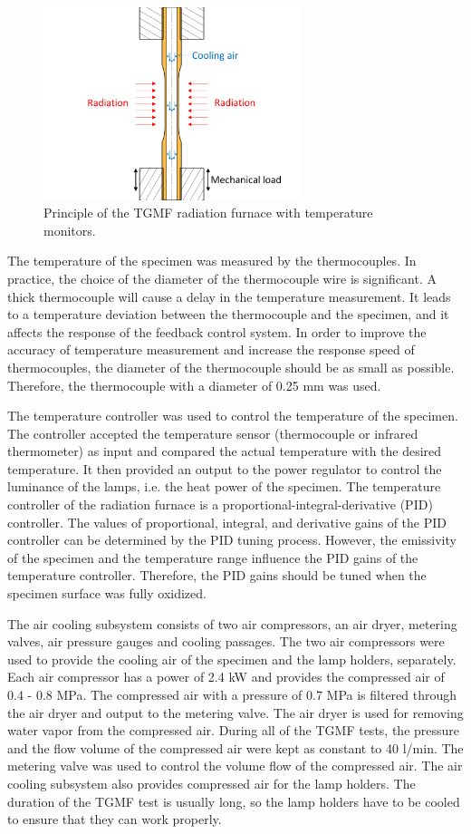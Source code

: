 \documentclass[preprint,5p,twocolumn,10pt,sort&compress]{elsarticle}
\begin{document}
\begin{figure}[!ht]
	\centering
	\includegraphics[width=7.5cm]{cooling.png}
	\caption{Principle of the TGMF radiation furnace with temperature monitors.}
	\label{Fig:cooling}
\end{figure}

The temperature of the specimen was measured by the thermocouples. In practice, the choice of the diameter of the thermocouple wire is significant. A thick thermocouple  will cause a delay in the temperature measurement. It leads to a temperature deviation between the thermocouple and the specimen, and it affects the response of the feedback control system. In order to improve the accuracy of temperature measurement and increase the response speed of thermocouples, the diameter of the thermocouple should be as small as possible. Therefore, the thermocouple with a diameter of 0.25 mm was used.

The temperature controller was used to control the temperature of the specimen.
The controller accepted the temperature sensor (thermocouple or infrared thermometer) as input and compared the actual temperature with the desired temperature. It then provided an output to the power regulator to control the luminance of the lamps, i.e. the heat power of the specimen. 
The temperature controller of the radiation furnace is a proportional-integral-derivative (PID) controller. The values of proportional, integral, and derivative gains of the PID controller can be determined by the PID tuning process.
However, the emissivity of the specimen and the temperature range influence the PID gains of the temperature controller. Therefore, the PID gains should be tuned when the specimen surface was fully oxidized.

The air cooling subsystem consists of two air compressors, an air dryer, metering valves, air pressure gauges and cooling passages. 
The two air compressors were used to provide the cooling air of the specimen and the lamp holders, separately.
Each air compressor has a power of 2.4 kW and provides the compressed air of 0.4 - 0.8 MPa. The compressed air with a pressure of 0.7 MPa is filtered through the air dryer and output to the metering valve. The air dryer is used for removing water vapor from the compressed air.
During all of the TGMF tests, the pressure and the flow volume  of the compressed air were kept as constant to 40 l/min. The metering valve was used to control the volume flow of the compressed air.
The air cooling subsystem also provides compressed air for the lamp holders.
The duration of the TGMF test is usually long, so the lamp holders have to be cooled to ensure that they can work properly.
\end{document}
